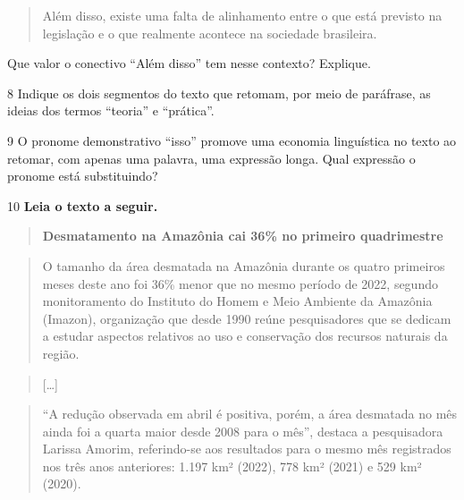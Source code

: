 \begin{quote}
Além disso, existe uma falta de alinhamento entre o que está previsto na
legislação e o que realmente acontece na sociedade brasileira.
\end{quote}

Que valor o conectivo ``Além disso'' tem nesse contexto? Explique.


\num{8} Indique os dois segmentos do texto que retomam, por meio de
paráfrase, as ideias dos termos ``teoria'' e ``prática''.


\num{9} O pronome demonstrativo ``isso'' promove uma economia
linguística no texto ao retomar, com apenas uma palavra, uma expressão
longa. Qual expressão o pronome está substituindo?


\num{10} \textbf{Leia o texto a seguir.}

\begin{quote}
\centering\textbf{Desmatamento na Amazônia cai 36\% no primeiro quadrimestre}
\end{quote}


\begin{quote}
O tamanho da área desmatada na Amazônia durante os quatro primeiros
meses deste ano foi 36\% menor que no mesmo período de 2022, segundo
monitoramento do Instituto do Homem e Meio Ambiente da Amazônia
(Imazon), organização que desde 1990 reúne pesquisadores que se dedicam
a estudar aspectos relativos ao uso e conservação dos recursos naturais
da região.
\end{quote}

\begin{quote}
{[}\ldots{]}
\end{quote}

\begin{quote}
``A redução observada em abril é positiva, porém, a área desmatada no
mês ainda foi a quarta maior desde 2008 para o mês'', destaca a
pesquisadora Larissa Amorim, referindo-se aos resultados para o mesmo
mês registrados nos três anos anteriores: 1.197 km² (2022), 778 km²
(2021) e 529 km² (2020).
\end{quote}

